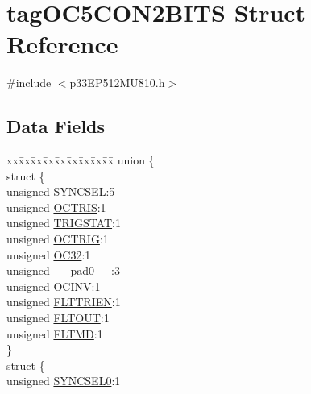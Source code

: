 \hypertarget{structtag_o_c5_c_o_n2_b_i_t_s}{}\section{tag\+O\+C5\+C\+O\+N2\+B\+I\+TS Struct Reference}
\label{structtag_o_c5_c_o_n2_b_i_t_s}


{\ttfamily \#include $<$p33\+E\+P512\+M\+U810.\+h$>$}

\subsection*{Data Fields}
\begin{DoxyCompactItemize}
\item 
\begin{tabbing}
xx\=xx\=xx\=xx\=xx\=xx\=xx\=xx\=xx\=\kill
union \{\\
\>struct \{\\
\>\>unsigned \hyperlink{structtag_o_c5_c_o_n2_b_i_t_s_a35fbbe11485c2615ed27535b62c3fa35}{SYNCSEL}:5\\
\>\>unsigned \hyperlink{structtag_o_c5_c_o_n2_b_i_t_s_ab849a74c6179282ed6b06cc047c80544}{OCTRIS}:1\\
\>\>unsigned \hyperlink{structtag_o_c5_c_o_n2_b_i_t_s_ab379549de54ac93ad4aa73686c34cb7c}{TRIGSTAT}:1\\
\>\>unsigned \hyperlink{structtag_o_c5_c_o_n2_b_i_t_s_a8d2cf9b996ef2b9079defa8950de798c}{OCTRIG}:1\\
\>\>unsigned \hyperlink{structtag_o_c5_c_o_n2_b_i_t_s_af52e127483a703e0fa84c7d4f1de0df4}{OC32}:1\\
\>\>unsigned \hyperlink{structtag_o_c5_c_o_n2_b_i_t_s_adf71f3d8410c1f1dbbc96680a92c49af}{\_\_pad0\_\_}:3\\
\>\>unsigned \hyperlink{structtag_o_c5_c_o_n2_b_i_t_s_a301004fca40c8d19d418866c92c19a06}{OCINV}:1\\
\>\>unsigned \hyperlink{structtag_o_c5_c_o_n2_b_i_t_s_ab979b75e02643aa840fb6ee50e0c30fa}{FLTTRIEN}:1\\
\>\>unsigned \hyperlink{structtag_o_c5_c_o_n2_b_i_t_s_ae466664b094d9c830e9ce20b86d7907f}{FLTOUT}:1\\
\>\>unsigned \hyperlink{structtag_o_c5_c_o_n2_b_i_t_s_a245ca3019d6c6ccbfb09f1c821146bb5}{FLTMD}:1\\
\>\} \\
\>struct \{\\
\>\>unsigned \hyperlink{structtag_o_c5_c_o_n2_b_i_t_s_a3b5df3154fde5141e6ac0156425ff8b4}{SYNCSEL0}:1\\

\end{tabbing}
\end{DoxyCompactItemize}
